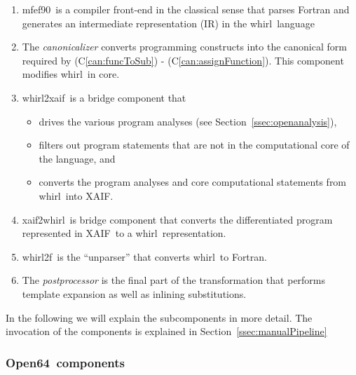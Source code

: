 \documentclass[acmtocl,acmnow]{acmtrans2m}
\newcommand{\mfefninety}{mfef90}
\newcommand{\OpenSixtyFour}{Open64}
\newcommand{\xaif}{XAIF}
\newcommand{\whirl}{whirl}
\newcommand{\whirlToxaif}{whirl2xaif}
\newcommand{\whirlTof}{whirl2f}
\newcommand{\xaifTowhirl}{xaif2whirl}
\newcommand{\refcan}[1]{(C\ref{#1})}
\newcommand{\refsec}[1]{Section~\ref{#1}}
\begin{document}
   \begin{enumerate}	
     \item \mfefninety\ is a compiler front-end in the classical sense that parses
       Fortran and generates an intermediate representation (IR)
       in the \whirl\ language

     \item The {\em canonicalizer} converts  
        programming constructs into the canonical form required by 
	\refcan{can:funcToSub} - \refcan{can:assignFunction}. 
	This component modifies \whirl\ in core.

     \item \whirlToxaif\ is a bridge component that
        \begin{itemize}
           \item drives the various program analyses (see \refsec{ssec:openanalysis}),
        
           \item filters out program statements that are not in the
                 computational core of the language, and 

           \item converts the program analyses and core computational
                 statements from \whirl\ into \xaif.
        \end{itemize}

     \item \xaifTowhirl\ is bridge component that converts the 
        differentiated program represented in \xaif\ 
        to a \whirl\ representation.

     \item \whirlTof\ is the ``unparser'' that converts \whirl\ to
        Fortran.

     \item The {\em postprocessor} is the  final part of the transformation that
        performs template expansion as well as inlining substitutions.

   \end{enumerate}

In the following we will explain the subcomponents in more detail.
The invocation of the components is explained in
\refsec{ssec:manualPipeline}

\subsubsection{\OpenSixtyFour\ components} \label{sssec:mfef}
\end{document}
